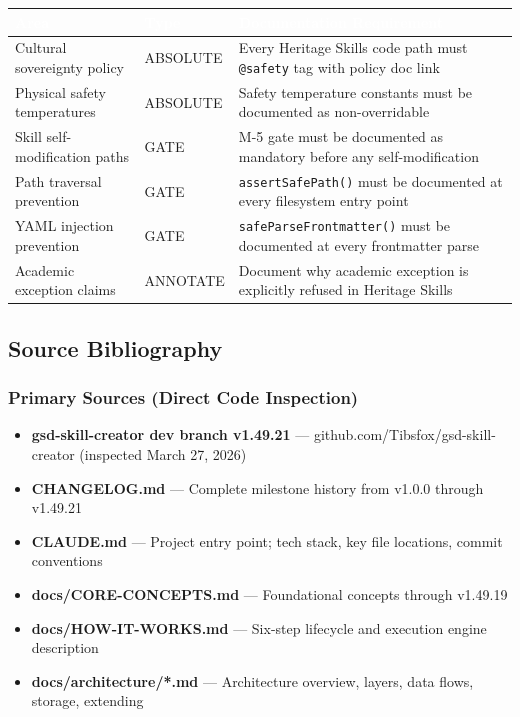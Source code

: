 \documentclass[11pt,letterpaper]{article}
\newcommand{\tableheader}[1]{\textbf{\sffamily\textcolor{white}{#1}}}
\begin{document}
\begin{center}
\begin{tabularx}{\textwidth}{L{4cm}L{2cm}X}
\toprule
{}
\tableheader{Area} & \tableheader{Type} & \tableheader{Documentation Requirement} \\
\midrule
Cultural sovereignty policy & ABSOLUTE & Every Heritage Skills code path must \texttt{@safety} tag with policy doc link \\
Physical safety temperatures & ABSOLUTE & Safety temperature constants must be documented as non-overridable \\
Skill self-modification paths & GATE & M-5 gate must be documented as mandatory before any self-modification \\
Path traversal prevention & GATE & \texttt{assertSafePath()} must be documented at every filesystem entry point \\
YAML injection prevention & GATE & \texttt{safeParseFrontmatter()} must be documented at every frontmatter parse \\
Academic exception claims & ANNOTATE & Document why academic exception is explicitly refused in Heritage Skills \\
\bottomrule
\end{tabularx}
\end{center}

\subsection{Source Bibliography}

\subsubsection{Primary Sources (Direct Code Inspection)}

\begin{itemize}[noitemsep]
  \item \textbf{gsd-skill-creator dev branch v1.49.21} --- github.com/Tibsfox/gsd-skill-creator (inspected March 27, 2026)
  \item \textbf{CHANGELOG.md} --- Complete milestone history from v1.0.0 through v1.49.21
  \item \textbf{CLAUDE.md} --- Project entry point; tech stack, key file locations, commit conventions
  \item \textbf{docs/CORE-CONCEPTS.md} --- Foundational concepts through v1.49.19
  \item \textbf{docs/HOW-IT-WORKS.md} --- Six-step lifecycle and execution engine description
  \item \textbf{docs/architecture/*.md} --- Architecture overview, layers, data flows, storage, extending
\end{itemize}
\end{document}
